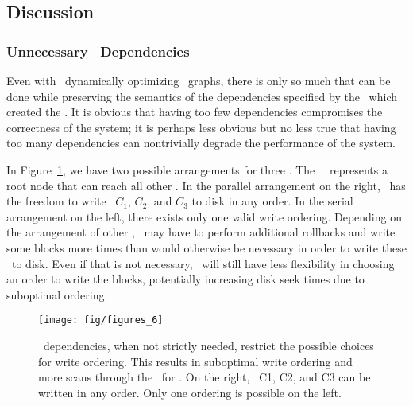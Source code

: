 

\subsection{Discussion}
\label{sec:chdescs:discussion}

\subsubsection{Unnecessary \ChDesc\ Dependencies}
Even with \Kudos\ dynamically optimizing \chdesc\ graphs, there is only so much
that can be done while preserving the semantics of the dependencies specified by
the \module\ which created the \chdescs. It is obvious that having too few
dependencies compromises the correctness of the system; it is perhaps less
obvious but no less true that having too many dependencies can nontrivially
degrade the performance of the system.

In Figure~\ref{fig:chdescarrange}, we have two possible arrangements for three
\chdescs. The \noop\ \chdesc\ represents a root node that can reach all
other \chdescs. In the parallel arrangement on the right, \Kudos\ has the
freedom to write \chdescs\ $C_1$, $C_2$, and $C_3$ to disk in any order. In the
serial arrangement on the left, there exists only one valid write ordering.
Depending on the arrangement of other \chdescs, \Kudos\ may have to perform
additional rollbacks and write some blocks more times than would otherwise be
necessary in order to write these \chdescs\ to disk. Even if that is not
necessary, \Kudos\ will still have less flexibility in choosing an order to
write the blocks, potentially increasing disk seek times due to suboptimal
ordering.

\begin{figure}[htb]
  \centering
  \texttt{[image: fig/figures\_6]}
  \caption{\label{fig:chdescarrange} \Chdesc\ dependencies, when
  not strictly needed, restrict the possible choices for write ordering.
  This results in suboptimal write ordering and more scans through the
  \chdescs\ for \Kudos. On the right, \chdescs\ C1, C2, and C3 can be written
  in any order. Only one ordering is possible on the left.}
\end{figure}

